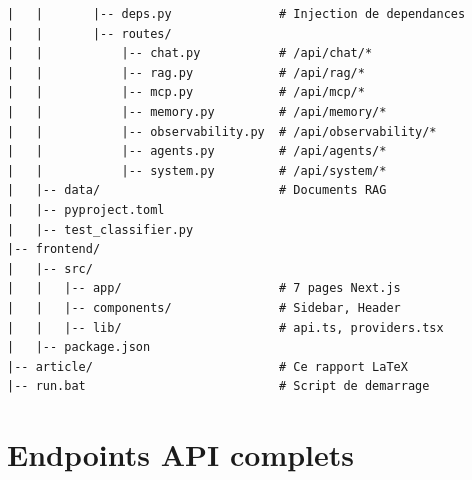 \documentclass[12pt, a4paper]{article}
\begin{document}
\begin{lstlisting}[style=jsonstyle, caption={Arborescence complète du projet}, label={lst:full_tree}]
|   |       |-- deps.py               # Injection de dependances
|   |       |-- routes/
|   |           |-- chat.py           # /api/chat/*
|   |           |-- rag.py            # /api/rag/*
|   |           |-- mcp.py            # /api/mcp/*
|   |           |-- memory.py         # /api/memory/*
|   |           |-- observability.py  # /api/observability/*
|   |           |-- agents.py         # /api/agents/*
|   |           |-- system.py         # /api/system/*
|   |-- data/                         # Documents RAG
|   |-- pyproject.toml
|   |-- test_classifier.py
|-- frontend/
|   |-- src/
|   |   |-- app/                      # 7 pages Next.js
|   |   |-- components/               # Sidebar, Header
|   |   |-- lib/                      # api.ts, providers.tsx
|   |-- package.json
|-- article/                          # Ce rapport LaTeX
|-- run.bat                           # Script de demarrage
\end{lstlisting}

\section{Endpoints API complets}
\label{app:api}
\end{document}
